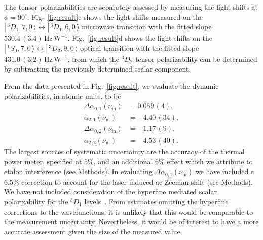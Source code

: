 \documentclass[pra,aps,showpacs,floatfix,twocolumn,nofootinbib,citeautoscript]{revtex4-1}
\def\ket#1{|\,#1 \,\rangle}
\newcommand{\fref}[1]{Fig.~\ref{#1}}
\begin{document}
The tensor polarizabilities are separately assessed by measuring the light shifts at $\phi=90^\circ$. \fref{fig:result}c shows the light shifts measured on the  $\ket{^3D_1,7,0} \leftrightarrow \ket{^3D_1,6,0}$ microwave transition with the fitted slope $530.4 \,(3.4)\, \mathrm{Hz}\,\mathrm{W}^{-1}$. \fref{fig:result}d shows the light shifts on the  $\ket{^1S_0,7,0} \leftrightarrow  \ket{^3D_2,9,0}$ optical transition with the fitted slope $431.0 \,(3.2)\, \mathrm{Hz}\,\mathrm{W}^{-1}$, from which the $^3D_2$ tensor polarizability can be determined by subtracting the previously determined scalar component.

From the data presented in \fref{fig:result}, we evaluate the dynamic polarizabilities, in atomic units, to be
\begin{align}
\Delta \alpha_{0,1}(\nu_\mathrm{m} ) &= 0.059\,(4) , \nonumber\\
 \alpha_{2,1}(\nu_\mathrm{m} ) &= -4.40  \,(34), \nonumber\\
\Delta \alpha_{0,2} (\nu_\mathrm{m} )&= -1.17  \,(9), \nonumber\\
 \alpha_{2,2}(\nu_\mathrm{m} ) &= -4.53  \,(40).
\end{align}
The largest sources of systematic uncertainty are the accuracy of the thermal power meter, specified at 5\%, and an additional 6\% effect which we attribute to etalon interference (see Methods). In evaluating $\Delta \alpha_{0,1}(\nu_\mathrm{m})$ we have included a 6.5\% correction to account for the laser induced ac Zeeman shift (see Methods).  We have not included consideration of the hyperfine mediated scalar polarizability for the $^3D_1$ levels~\cite{itanoBBR,Dzubahyperfinepol}.  From estimates omitting the hyperfine corrections to the wavefunctions, it is unlikely that this would be comparable to the measurement uncertainty.  Nevertheless, it would be of interest to have a more accurate assessment given the size of the measured value.
\end{document}
